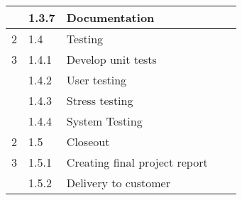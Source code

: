\begin{longtable}{|m{}|m{}|m{}|m{}|m{}|}
\hline
	 & 1.3.7 & Documentation & & \\
\hline
	2 & 1.4 & Testing & & \\
\hline
	3 & 1.4.1 & Develop unit tests & & \\
\hline
	 & 1.4.2 & User testing & & \\
\hline
	 & 1.4.3 & Stress testing & & \\
\hline
	 & 1.4.4 & System Testing & & \\
\hline
	2 & 1.5 & Closeout & & \\
\hline
	3 & 1.5.1 & Creating final project report & & \\
\hline
	 & 1.5.2 & Delivery to customer & & \\
\hline
\end{longtable}
